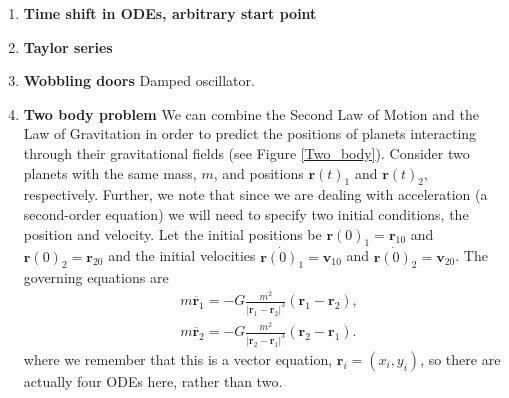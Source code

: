 \documentclass[]{article}
\newcommand{\see}[1]{(see Figure \ref{#1})}
\renewcommand{\l}{\left(}
\renewcommand{\r}{\right)}
\begin{document}
\begin{enumerate}
\item \textbf{Time shift in ODEs, arbitrary start point}
\item \textbf{Taylor series}
\item \textbf{Wobbling doors} Damped oscillator.

\item \textbf{Two body problem}
We can combine the Second Law of Motion and the Law of Gravitation in order to predict the positions of planets interacting through their gravitational fields \see{Two_body}. Consider two planets with the same mass, $m$, and positions $\bm{r}(t)_1$ and $\bm{r}(t)_2$, respectively. Further, we note that since we are dealing with acceleration (a second-order equation) we will need to specify two initial conditions, the position and velocity. Let the initial positions be $\bm{r}(0)_1=\bm{r}_{10}$ and $\bm{r}(0)_2=\bm{r}_{20}$ and the initial velocities $\dot{\bm{r}(0)_1}=\bm{v}_{10}$ and $\dot{\bm{r}(0)_2}=\bm{v}_{20}$. The governing equations are
\begin{align}
&m\ddot{\bm{r}_1}=-G\frac{m^2}{|\bm{r}_1-\bm{r}_2|^3}\l\bm{r}_1-\bm{r}_2\r,\label{g1}\\
&m\ddot{\bm{r}_2}=-G\frac{m^2}{|\bm{r}_2-\bm{r}_1|^3}\l\bm{r}_2-\bm{r}_1\r\label{g2}.
\end{align}
where we remember that this is a vector equation, $\bm{r}_i=(x_i,y_i)$, so there are actually four ODEs here, rather than two.


\end{enumerate}
\end{document}
